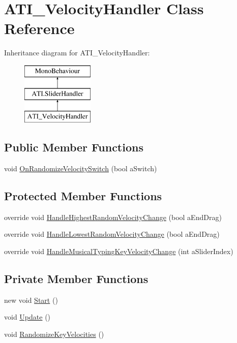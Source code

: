 \hypertarget{class_a_t_i___velocity_handler}{}\section{A\+T\+I\+\_\+\+Velocity\+Handler Class Reference}
\label{class_a_t_i___velocity_handler}
Inheritance diagram for A\+T\+I\+\_\+\+Velocity\+Handler\+:\begin{figure}[H]
\begin{center}
\leavevmode
\includegraphics[height=3.000000cm]{class_a_t_i___velocity_handler}
\end{center}
\end{figure}
\subsection*{Public Member Functions}
\begin{DoxyCompactItemize}
\item 
void \hyperlink{class_a_t_i___velocity_handler_a1091248299687641294f363aa32de0f0}{On\+Randomize\+Velocity\+Switch} (bool a\+Switch)
\end{DoxyCompactItemize}
\subsection*{Protected Member Functions}
\begin{DoxyCompactItemize}
\item 
override void \hyperlink{class_a_t_i___velocity_handler_a6e1fd3ceb35873a09e138bebd0c323fd}{Handle\+Highest\+Random\+Velocity\+Change} (bool a\+End\+Drag)
\item 
override void \hyperlink{class_a_t_i___velocity_handler_a17b6e0de9e45dfb9dba1ea4f2c0a122c}{Handle\+Lowest\+Random\+Velocity\+Change} (bool a\+End\+Drag)
\item 
override void \hyperlink{class_a_t_i___velocity_handler_a5b00635239f4f10aaefc5898a8f1b975}{Handle\+Musical\+Typing\+Key\+Velocity\+Change} (int a\+Slider\+Index)
\end{DoxyCompactItemize}
\subsection*{Private Member Functions}
\begin{DoxyCompactItemize}
\item 
new void \hyperlink{class_a_t_i___velocity_handler_a76342d6f2b240a3007b20b9539e4c7a6}{Start} ()
\item 
void \hyperlink{class_a_t_i___velocity_handler_aa5766a74ea02f8e1d789a3863ce5867b}{Update} ()
\item 
void \hyperlink{class_a_t_i___velocity_handler_aa1a10281dafc6666677e4255ad663dde}{Randomize\+Key\+Velocities} ()
\end{DoxyCompactItemize}

